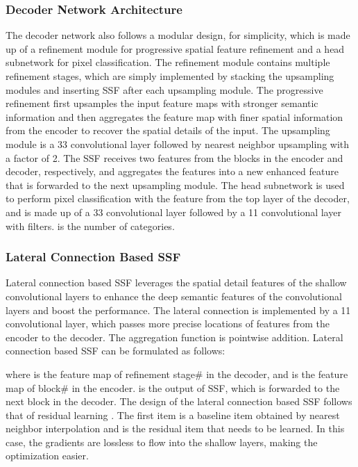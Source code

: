 \documentclass[journal]{IEEEtran}
\begin{document}
\subsubsection{\textbf{Decoder Network Architecture}}
The decoder network also follows a modular design, for simplicity, which is made up of a refinement module for progressive spatial feature refinement and a head subnetwork for pixel classification.
The refinement module contains multiple refinement stages, which are simply implemented by stacking the upsampling modules and inserting SSF after each upsampling module.
The progressive refinement first upsamples the input feature maps with stronger semantic information and then aggregates the feature map with finer spatial information from the encoder to recover the spatial details of the input.
The upsampling module is a 33 convolutional layer followed by nearest neighbor upsampling with a factor of 2.
The SSF receives two features from the blocks in the encoder and decoder, respectively, and aggregates the features into a new enhanced feature that is forwarded to the next upsampling module.
The head subnetwork is used to perform pixel classification with the feature from the top layer of the decoder, and is made up of a 33 convolutional layer followed by a 11 convolutional layer with  filters.
 is the number of categories.

\subsubsection{\textbf{Lateral Connection Based SSF}}
\label{sec:ssf}
Lateral connection based SSF leverages the spatial detail features of the shallow convolutional layers to enhance the deep semantic features of the convolutional layers and boost the performance.
The lateral connection is implemented by a 11 convolutional layer, which passes more precise locations of features from the encoder to the decoder.
The aggregation function is pointwise addition.
Lateral connection based SSF can be formulated as follows:

where  is the feature map of refinement stage\# in the decoder, and  is the feature map of block\# in the encoder.
 is the output of SSF, which is forwarded to the next block in the decoder.
The design of the lateral connection based SSF follows that of residual learning \cite{he2016deep}.
The first item  is a baseline item obtained by nearest neighbor interpolation and  is the residual item that needs to be learned.
In this case, the gradients are lossless to flow into the shallow layers, making the optimization easier.
\end{document}
